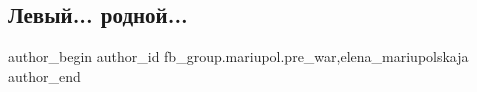  
 
 
 
 

\subsection{Левый... родной...}
\label{sec:27_01_2023.fb.fb_group.mariupol.pre_war.3.levii__rodnoi_}
 
\ifcmt
 author_begin
   author_id fb_group.mariupol.pre_war,elena_mariupolskaja
 author_end
\fi
